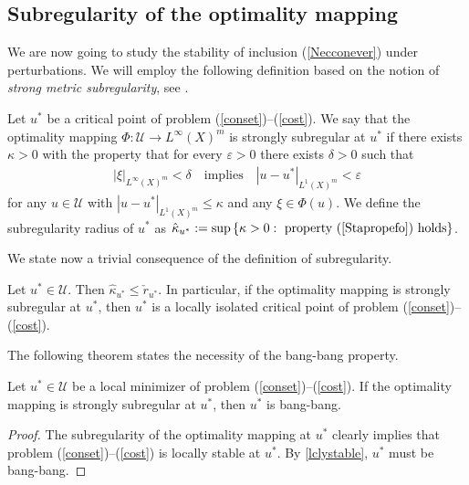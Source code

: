 \documentclass[hidelinks,onefignum,onetabnum]{siamart220329}
\begin{document}
\subsection{Subregularity of the optimality mapping}
We are now going to study the stability of inclusion (\ref{Necconever}) under perturbations. We will employ the following definition based on the notion of \textit{strong metric subregularity}, see  \cite[Introduction]{Smsr}.
\begin{definition}
	Let $u^*$ be a critical point of problem (\ref{conset})--(\ref{cost}). We say that the optimality mapping $\Phi:\mathcal U\to L^\infty(X)^m$ is strongly subregular at $u^*$ if there exists $\kappa>0$ with the property that for every $\varepsilon>0$ there exists $\delta>0$ such that
	\begin{align}\label{Stapropefo}
	|\xi|_{L^\infty(X)^m }<\delta \quad\text{implies}\quad |u-u^*|_{{L^1(X)^m}}<\varepsilon
	\end{align}
	for any $u\in\mathcal U$ with $|u-u^*|_{{L^1(X)^m}}\le\kappa$ and any $\xi\in\Phi(u)$.
	We define the  subregularity radius of $u^*$ as $\hat\kappa_{u^*}:=\sup\left\lbrace\kappa>0:\text{ property (\ref{Stapropefo}) holds}\right\rbrace$.

\end{definition}


We state now a trivial consequence of the definition of subregularity. 
\begin{proposition}\label{genprop0}
	Let $u^*\in\mathcal U$. Then $\hat\kappa_{u^*}\le\check r_{u^*}$. In particular, if the optimality mapping is strongly subregular at $u^*$, then $u^*$ is a locally isolated critical point of problem (\ref{conset})--(\ref{cost}).
\end{proposition}

The following theorem states the necessity of the bang-bang property.

\begin{lemma}\label{lemma0}
	 Let $u^*\in\mathcal U$ be a local minimizer of problem (\ref{conset})--(\ref{cost}). If the optimality mapping is strongly subregular at $u^*$, then $u^*$ is bang-bang.
\end{lemma}
\begin{proof}
The subregularity of the optimality mapping at $u^*$ clearly implies that problem (\ref{conset})--(\ref{cost}) is locally stable at $u^*$. By \cref{lclystable}, $u^*$ must be bang-bang.
\end{proof}
\end{document}
